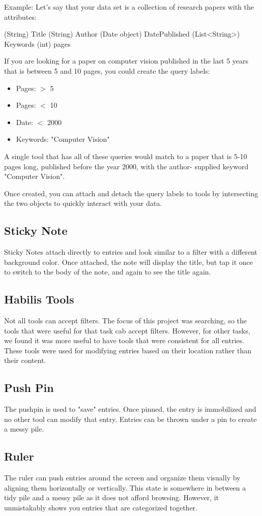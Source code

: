 \documentclass{article}
\begin{document}
Example: Let's say that your data set is a collection of research papers with the attributes: 

(String) Title
(String) Author
(Date object) DatePublished
(List<String>) Keywords
(int) pages

If you are looking for a paper on computer vision published in the last 5 years that is between 5 and 10 pages, you could create the query labels:
\begin{itemize}
\item Pages: $>$ 5
\item Pages: $<$ 10
\item Date: $<$ 2000
\item Keywords: "Computer Vision"

\end{itemize}

A single tool that has all of these queries would match to a paper that is 5-10 pages long, published before the year 2000, with the author- supplied keyword "Computer Vision".


Once created, you can attach and detach the query labels to tools by intersecting the two objects to quickly interact with your data.

\subsection*{Sticky Note}
Sticky Notes attach directly to entries and look similar to a filter with a different background color.  Once attached, the note will display the title, but tap it once to switch to the body of the note, and again to see the title again.
\subsection{Habilis Tools}
Not all tools can accept filters.  The focus of this project was searching, so the tools that were useful for that task cab accept filters. However, for other tasks, we found it was more useful to have tools that were consistent for all entries.  These tools were used for modifying entries based on their location rather than their content.   	
\subsection*{Push Pin}
The pushpin is used to "save" entries.  Once pinned, the entry is immobilized and no other tool can modify that entry.  Entries can be thrown under a pin to create a messy pile.  
\subsection*{Ruler}
The ruler can push entries around the screen and organize them visually by aligning them horizontally or vertically.  This state is somewhere in between a tidy pile and a messy pile as it does not afford browsing.  However, it unmistakably shows you entries that are categorized together.  
\end{document}

